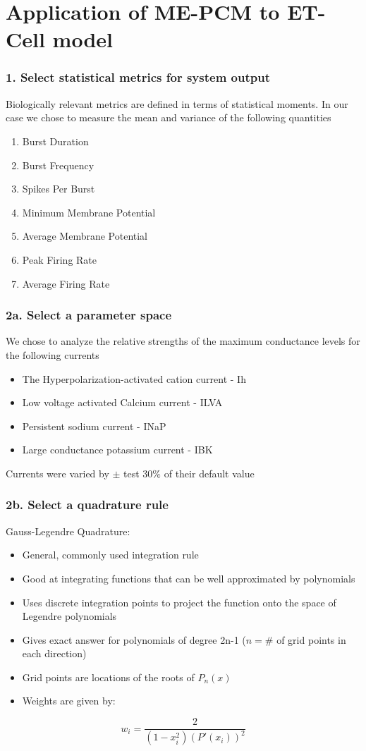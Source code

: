 \documentclass{beamer}
\theoremstyle{plain}
\theoremstyle{definition}
\begin{document}
 \section{Application of ME-PCM to ET-Cell model}

 \begin{frame}\frametitle{1. Select statistical metrics for system output}
   Biologically relevant metrics are defined in terms of statistical moments. In our case we chose to measure the mean and variance of the following quantities
   \begin{enumerate}
     \item Burst Duration
     \item Burst Frequency
     \item Spikes Per Burst
     \item Minimum Membrane Potential
     \item Average Membrane Potential
     \item Peak Firing Rate
     \item Average Firing Rate
   \end{enumerate}
 \end{frame}

\begin{frame}\frametitle{2a. Select a parameter space}
  We chose to analyze the relative strengths of the maximum conductance levels for the following currents
 \begin{itemize}
   \item The Hyperpolarization-activated cation current - Ih
   \item Low voltage activated Calcium current - ILVA
   \item Persistent sodium current - INaP
   \item Large conductance potassium current - IBK
 \end{itemize}

 Currents were varied by $\pm$ test $30\%$ of their default value
\end{frame}

\begin{frame}\frametitle{2b. Select a quadrature rule}
  Gauss-Legendre Quadrature:
  \begin{itemize}
    \item General, commonly used integration rule
    \item Good at integrating functions that can be well approximated by polynomials
    \item Uses discrete integration points to project the function onto the space of Legendre polynomials
    \item Gives exact answer for polynomials of degree 2n-1 ($n = \#$ of grid points in each direction)
    \item Grid points are locations of the roots of $P_n(x)$
    \item Weights are given by:
  \end{itemize}

  \begin{equation*}
    w_i = \frac{2}{(1-x_i^2)(P'(x_i))^2}
  \end{equation*}

\end{frame}
\end{document}
